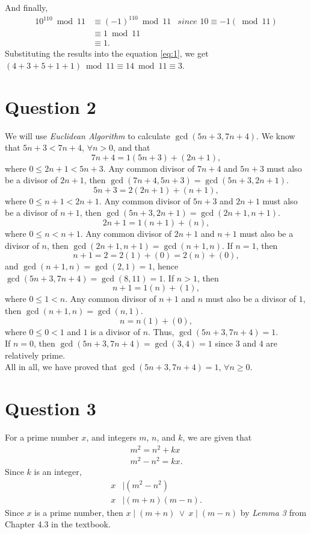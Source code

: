\documentclass[12pt]{article}
\begin{document}
And finally,
\begin{align*}
    10^{110} \bmod 11 & \equiv (-1)^{110} \bmod 11 & \textit{since $10 \equiv -1 (\bmod 11)$} \\
    & \equiv 1 \bmod 11 & \\
    & \equiv 1. & 
\end{align*}
Substituting the results into the equation \eqref{eq:1}, we get $(4 + 3 + 5 + 1 + 1) \bmod 11 \equiv 14 \bmod 11 \equiv 3$.

\section*{Question 2}
We will use \textit{Euclidean Algorithm} to calculate $\gcd{(5n + 3, 7n + 4)}$. We know that $5n + 3 < 7n + 4$, $\forall n > 0$, and that
\[
    7n + 4 = 1 (5n + 3) + (2n + 1),
\]
where $0 \le 2n + 1 < 5n + 3$. Any common divisor of $7n + 4$ and $5n + 3$ must also be a divisor of $2n + 1$, then $\gcd{(7n + 4, 5n + 3)} = \gcd{(5n + 3, 2n + 1)}$.
\[
    5n + 3 = 2 (2n + 1) + (n + 1),
\]
where $0 \le n + 1 < 2n + 1$. Any common divisor of $5n + 3$ and $2n + 1$ must also be a divisor of $n + 1$, then $\gcd{(5n + 3, 2n + 1)} = \gcd{(2n + 1, n + 1)}$.
\[
    2n + 1 = 1 (n + 1) + (n),
\]
where $0 \le n < n + 1$. Any common divisor of $2n + 1$ and $n + 1$ must also be a divisor of $n$, then $\gcd{(2n + 1, n + 1)} = \gcd{(n + 1, n)}$. If $n = 1$, then
\[
    n + 1 = 2 = 2 (1) + (0) = 2 (n) + (0),
\]
and $\gcd{(n + 1, n)} = \gcd{(2, 1)} = 1$, hence $\gcd{(5n + 3, 7n + 4)} = \gcd{(8, 11)} = 1$. If $n > 1$, then
\[
    n + 1 = 1 (n) + (1),
\]
where $0 \le 1 < n$. Any common divisor of $n + 1$ and $n$ must also be a divisor of $1$, then $\gcd{(n + 1, n)} = \gcd{(n, 1)}$.
\[
    n = n (1) + (0),
\]
where $0 \le 0 < 1$ and $1$ is a divisor of $n$. Thus, $\gcd{(5n + 3, 7n + 4)} = 1$. \\

\noindent If $n = 0$, then $\gcd{(5n + 3, 7n + 4)} = \gcd{(3, 4)} = 1$ since $3$ and $4$ are relatively prime. \\
All in all, we have proved that $\gcd{(5n + 3, 7n + 4)} = 1$, $\forall n \ge 0$.

\newpage
\section*{Question 3}
For a prime number $x$, and integers $m$, $n$, and $k$, we are given that
\begin{align*}
    m^2 = n^2 + k x \\
    m^2 - n^2 = k x.
\end{align*}
Since $k$ is an integer,
\begin{align*}
    x &\mid (m^2 - n^2) \\
    x &\mid (m + n)(m - n).
\end{align*}
Since $x$ is a prime number, then $x \mid (m + n) \ \vee \ x \mid (m - n)$ by \textit{Lemma 3} from Chapter 4.3 in the textbook.
\end{document}

